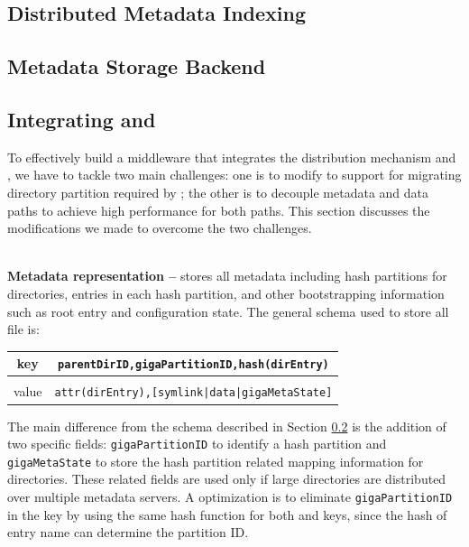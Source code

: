 \subsection{Distributed Metadata Indexing}
\label{design.giga}


\subsection{Metadata Storage Backend}
\label{design.tablefs}


\subsection{Integrating \giga{} and \tfs{}}
\label{design.integration}

To effectively build a middleware that integrates
the \giga distribution mechanism and \tfs,
we have to tackle two main challenges:
one is to modify \tfs to support for
migrating directory partition required by \giga;
the other is to decouple metadata and data paths to
achieve high performance for both paths.
This section discusses the modifications we made to
overcome the two challenges.


~\\
\textbf{Metadata representation -- }
\tfs stores all metadata including \giga hash
partitions for directories, entries in each hash partition, and other
bootstrapping information such as root entry and \giga configuration state.
The general schema used to store all file is:

\begin{table}[!htc]
\begin{tabular}{c|c}
key & \texttt{parentDirID,gigaPartitionID,hash(dirEntry)} \\
\midrule \\
value & \texttt{attr(dirEntry),[symlink|data|gigaMetaState]} \\
\end{tabular}
\label{tab:keyschema}
\end{table}

The main difference from the \tfs schema described in Section
\ref{design.tablefs} is the addition of two \giga specific fields:
\texttt{gigaPartitionID} to identify a
\giga hash partition and \texttt{gigaMetaState} to store the
hash partition related mapping information for directories.
These \giga related fields are used only
if large directories are distributed over multiple metadata servers.
A optimization is to eliminate \texttt{gigaPartitionID} in the key
by using the same hash function for both \giga and \tfs keys,
since the hash of entry name can determine the partition ID.

